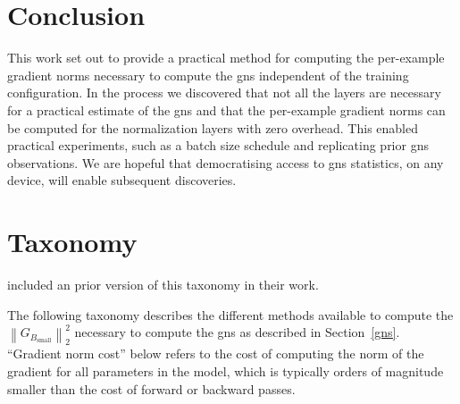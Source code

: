 \documentclass{article}
\newcommand{\Gsmall}{G_{B_{\textrm{small}}}} %
\newcommand{\sqn}[1]{\left\lVert#1\right\rVert_2^2}
\begin{document}


\section{Conclusion}\label{conclusion}

This work set out to provide a practical method for computing the per-example
gradient norms necessary to compute the \ac{gns} independent of the training
configuration. In the process we discovered that not all the layers are
necessary for a practical estimate of the \ac{gns} and that the per-example
gradient norms can be computed for the normalization layers with zero overhead.
This enabled practical experiments, such as a batch size schedule and
replicating prior \ac{gns} observations. We are hopeful that democratising
access to \ac{gns} statistics, on any device, will enable subsequent
discoveries.



\FloatBarrier
\clearpage
\appendix

\section{Taxonomy}\label{taxonomy}

\citet{gray2023efficient} included an prior version of this taxonomy in their
work.

The following taxonomy describes the different methods available to compute the
$\sqn{\Gsmall}$ necessary to compute the \ac{gns} as described in Section~\ref{gns}.
``Gradient norm cost'' below refers to the cost of computing the norm of the gradient
for all parameters in the model, which is typically orders of magnitude smaller
than the cost of forward or backward passes.
\end{document}
